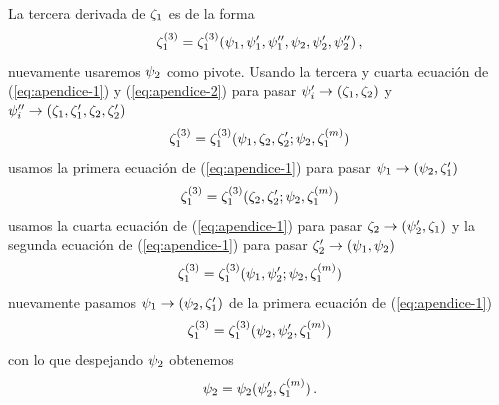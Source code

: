 \documentclass[%
 aip,
 jmp,%
 amsmath,amssymb,
 reprint,%
]{revtex4-2}
\begin{document}
{La tercera derivada de $\zeta_1$ es de la forma
\begin{equation}
    \zeta_1^{(3)}=\zeta_1^{(3)}(\psi_1,\psi_1',\psi_1'',\psi_2,\psi_2',\psi_2'')\,,
\end{equation}
nuevamente usaremos $\psi_2$ como pivote. Usando la tercera y cuarta ecuación de (\ref{eq:apendice-1}) y (\ref{eq:apendice-2}) para pasar $\psi_i'\rightarrow (\zeta_1,\zeta_2)$ y $\psi_i''\rightarrow (\zeta_1,\zeta_1',\zeta_2,\zeta_2')$
\begin{equation}
     \zeta_1^{(3)}=\zeta_1^{(3)}(\psi_1,\zeta_2,\zeta_2';\psi_2,\zeta_1^{(m)})
\end{equation}
usamos la primera ecuación de (\ref{eq:apendice-1}) para pasar $\psi_1\rightarrow (\psi_2,\zeta_1')$
\begin{equation}
     \zeta_1^{(3)}=\zeta_1^{(3)}(\zeta_2,\zeta_2';\psi_2,\zeta_1^{(m)})
\end{equation}
usamos la cuarta ecuación de (\ref{eq:apendice-1}) para pasar $\zeta_2\rightarrow (\psi_2',\zeta_1)$ y la segunda ecuación de (\ref{eq:apendice-1}) para pasar $\zeta_2'\rightarrow (\psi_1,\psi_2)$
\begin{equation}
     \zeta_1^{(3)}=\zeta_1^{(3)}(\psi_1,\psi_2';\psi_2,\zeta_1^{(m)})
\end{equation}
nuevamente pasamos $\psi_1\rightarrow (\psi_2,\zeta_1')$ de la primera ecuación de (\ref{eq:apendice-1})
\begin{equation}
     \zeta_1^{(3)}=\zeta_1^{(3)}(\psi_2,\psi_2',\zeta_1^{(m)})
\end{equation}
con lo que despejando $\psi_2$ obtenemos
\begin{equation}\label{eq:p_2-despejada}
    \psi_2=\psi_2(\psi_2',\zeta_1^{(m)})\,.
\end{equation}

}
\end{document}
